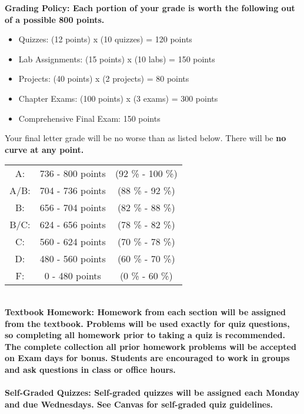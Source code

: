 \documentclass [11pt]{article}
\begin{document}
\noindent
\bfseries Grading Policy: \normalfont
Each portion of your grade is worth the following out of a {\bf possible 800 points}. \vspace{-2mm}
\begin {itemize}
\setlength{\itemsep}{1pt}
\setlength{\parskip}{0pt}
\setlength{\parsep}{0pt}
\item Quizzes: (12 points) x (10 quizzes) = 120 points
\item Lab Assignments: (15 points) x (10 labs) = 150 points 
\item Projects: (40 points) x (2 projects) = 80 points
\item Chapter Exams: (100 points) x (3 exams) = 300 points
\item Comprehensive Final Exam: 150 points
\end {itemize} \vspace{-2mm}
Your final letter grade will be no worse than as listed below. There will be {\bf no curve at any point.} 
\begin{center}
\begin{tabular}{ccc}
A: & 736 - 800 points & (92 \% - 100 \%)\\
A/B: & 704 - 736 points & (88 \% - 92 \%)\\
B: & 656 - 704 points & (82 \% - 88 \%)\\
B/C: & 624 - 656 points & (78 \% - 82 \%)\\
C: & 560 - 624 points & (70 \% - 78 \%)\\
D: & 480 - 560 points & (60 \% - 70 \%)\\
F: & 0 - 480 points & (0 \% - 60 \%)
\end{tabular}
\end{center}
\ \\
\bfseries Textbook Homework: \normalfont Homework from each section will be assigned from the textbook. Problems will be used exactly for quiz questions, so completing all homework prior to taking a quiz is recommended. The complete collection all prior homework problems will be accepted on Exam days for bonus. Students are encouraged to work in groups and ask questions in class or office hours.
\\
\ \\
\bfseries Self-Graded Quizzes: \normalfont Self-graded quizzes will be assigned each Monday and due Wednesdays. See Canvas for self-graded quiz guidelines. \\
\end{document}
